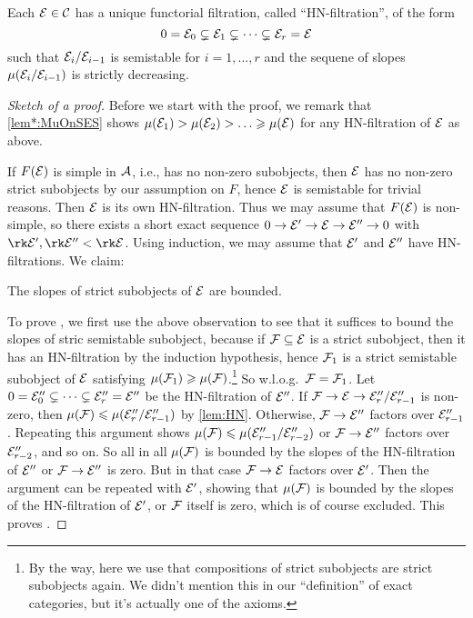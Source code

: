 \documentclass[a4paper, 10pt, oneside, DIV=9, chapterprefix=true, numbers=enddot,bibliography=totoc]{scrbook}
\begin{document}
\begin{thm}\label{thm:HN}
	Each $\mathcal{E}\in \mathcal{C}$ has a unique functorial filtration, called \enquote{HN-filtration}, of the form
	\begin{equation*}
		0=\mathcal{E}_0\subsetneq \mathcal{E}_1\subsetneq\dotsb\subsetneq \mathcal{E}_r=\mathcal{E}
	\end{equation*}
	such that $\mathcal{E}_i/\mathcal{E}_{i-1}$ is semistable for $i=1,\dotsc,r$ and the sequene of slopes $\mu(\mathcal{E}_i/\mathcal{E}_{i-1})$ is strictly decreasing.
\end{thm}
\begin{proof}[Sketch of a proof]
	Before we start with the proof, we remark that \cref{lem*:MuOnSES} shows $\mu(\mathcal{E}_1)> \mu(\mathcal{E}_2)> \dotsc \geqslant \mu(\mathcal{E})$ for any HN-filtration of $\mathcal{E}$ as above.
	
	If $F(\mathcal{E})$ is simple in $\mathcal{A}$, i.e., has no non-zero subobjects, then $\mathcal{E}$ has no non-zero strict subobjects by our assumption on $F$, hence $\mathcal{E}$ is semistable for trivial reasons. Then $\mathcal{E}$ is its own HN-filtration. Thus we may assume that $F(\mathcal{E})$ is non-simple, so there exists a short exact sequence $0\morphism \Ee'\morphism \Ee\morphism \Ee''\morphism 0$ with $\rk \Ee',\rk\Ee'' <\rk \Ee$. Using induction, we may assume that $\mathcal{E}'$ and $\mathcal{E}''$ have HN-filtrations. We claim:
	\begin{alphanumerate}
		\item[\itememph{*}] The slopes of strict subobjects of $\mathcal{E}$ are bounded.
	\end{alphanumerate}
	To prove \itememph{*}, we first use the above observation to see that it suffices to bound the slopes of stric semistable subobject, because if $\mathcal{F}\subseteq \mathcal{E}$ is a strict subobject, then it has an HN-filtration by the induction hypothesis, hence $\mathcal{F}_1$ is a strict semistable subobject of $\mathcal{E}$ satisfying $\mu(\mathcal{F}_1)\geqslant \mu(\mathcal{F})$.\footnote{By the way, here we use that compositions of strict subobjects are strict subobjects again. We didn't mention this in our \enquote{definition} of exact categories, but it's actually one of the axioms.} So w.l.o.g.\ $\mathcal{F}=\mathcal{F}_1$. Let $0=\mathcal{E}''_0\subsetneq\dotsb\subsetneq \mathcal{E}_r''=\mathcal{E}''$ be the HN-filtration of $\mathcal{E}''$. If $\Ff\morphism \Ee\morphism \Ee''_r/\Ee''_{r-1}$ is non-zero, then $\mu(\mathcal{F})\leqslant \mu(\mathcal{E}''_r/\mathcal{E}''_{r-1})$ by \cref{lem:HN}. Otherwise, $\Ff\morphism \Ee''$ factors over $\mathcal{E}''_{r-1}$. Repeating this argument shows $\mu(\mathcal{F})\leqslant \mu(\mathcal{E}''_{r-1}/\mathcal{E}''_{r-2})$ or $\Ff\morphism \Ee''$ factors over $\mathcal{E}''_{r-2}$, and so on. So all in all $\mu(\mathcal{F})$ is bounded by the slopes of the HN-filtration of $\mathcal{E}''$ or $\Ff\morphism \Ee''$ is zero. But in that case $\Ff\morphism \Ee$ factors over $\mathcal{E}'$. Then the argument can be repeated with $\mathcal{E}'$, showing that $\mu(\mathcal{F})$ is bounded by the slopes of the HN-filtration of $\mathcal{E}'$, or $\mathcal{F}$ itself is zero, which is of course excluded. This proves \itememph{*}.
	

\end{proof}
\end{document}
